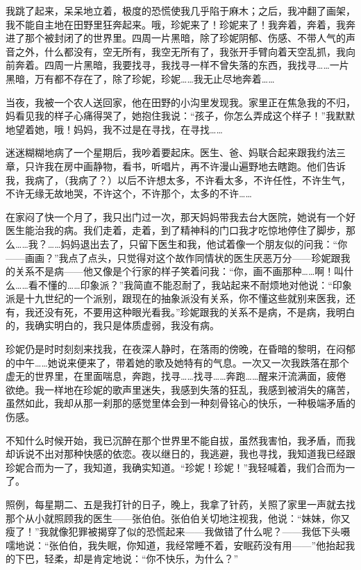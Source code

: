 \par 我跳了起来，呆呆地立着，极度的恐慌使我几乎陷于麻木；之后，我冲翻了画架，我不能自主地在田野里狂奔起来。哦，珍妮来了！珍妮来了！我奔着，奔着，我奔进了那个被封闭了的世界里。四周一片黑暗，除了珍妮阴郁、伤感、不带人气的声音之外，什么都没有，空无所有，我空无所有了，我张开手臂向着天空乱抓，我向前奔着。四周一片黑暗，我要找寻，我找寻一样不曾失落的东西，我找寻……一片黑暗，万有都不存在了，除了珍妮，珍妮……我无止尽地奔着……
\par 当夜，我被一个农人送回家，他在田野的小沟里发现我。家里正在焦急我的不归，妈看见我的样子心痛得哭了，她抱住我说：“孩子，你怎么弄成这个样子！”我默默地望着她，哦！妈妈，我不过是在寻找，在寻找……
\par 迷迷糊糊地病了一个星期后，我吵着要起床。医生、爸、妈联合起来跟我约法三章，只许我在房中画静物，看书，听唱片，再不许漫山遍野地去瞎跑。他们告诉我，我病了，（我病了？）以后不许想太多，不许看太多，不许任性，不许生气，不许无缘无故地哭，不许这个，不许那个，太多的不许……
\par 在家闷了快一个月了，我只出门过一次，那天妈妈带我去台大医院，她说有一个好医生能治我的病。我们走着，走着，到了精神科的门口我才吃惊地停住了脚步，那么……我？……妈妈退出去了，只留下医生和我，他试着像一个朋友似的问我：“你——画画？”我点了点头，只觉得对这个故作同情状的医生厌恶万分——珍妮跟我的关系不是病——他又像是个行家的样子笑着问我：“你，画不画那种……啊！叫什么……看不懂的……印象派？”我简直不能忍耐了，我站起来不耐烦地对他说：“印象派是十九世纪的一个派别，跟现在的抽象派没有关系，你不懂这些就别来医我，还有，我还没有死，不要用这种眼光看我。”珍妮跟我的关系不是病，不是病，我明白的，我确实明白的，我只是体质虚弱，我没有病。
\par 珍妮仍是时时刻刻来找我，在夜深人静时，在落雨的傍晚，在昏暗的黎明，在闷郁的中午……她说来便来了，带着她的歌及她特有的气息。一次又一次我跌落在那个虚无的世界里，在里面喘息，奔跑，找寻……找寻……奔跑……醒来汗流满面，疲倦欲绝。我一样地在珍妮的歌声里迷失，我感到失落的狂乱，我感到被消失的痛苦，虽然如此，我却从那一刹那的感觉里体会到一种刻骨铭心的快乐，一种极端矛盾的伤感。
\par 不知什么时候开始，我已沉醉在那个世界里不能自拔，虽然我害怕，我矛盾，而我却诉说不出对那种快感的依恋。夜以继日的，我逃避，我也寻找，我知道我已经跟珍妮合而为一了，我知道，我确实知道。“珍妮！珍妮！”我轻喊着，我们合而为一了。
\par 照例，每星期二、五是我打针的日子，晚上，我拿了针药，关照了家里一声就去找那个从小就照顾我的医生——张伯伯。张伯伯关切地注视我，他说：“妹妹，你又瘦了！”我就像犯罪被揭穿了似的恐慌起来——我做错了什么呢？——我低下头嗫嚅地说：“张伯伯，我失眠，你知道，我经常睡不着，安眠药没有用——”他抬起我的下巴，轻柔，却是肯定地说：“你不快乐，为什么？”
